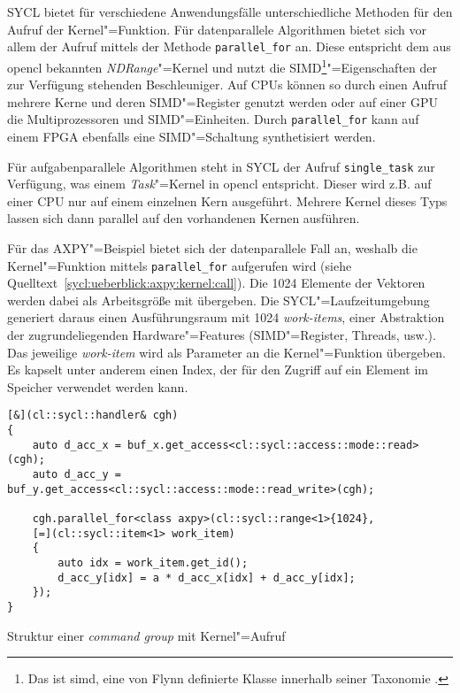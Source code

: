 SYCL bietet für verschiedene Anwendungsfälle unterschiedliche Methoden für den
Aufruf der Kernel"=Funktion. Für datenparallele Algorithmen bietet sich vor
allem der Aufruf mittels der Methode \texttt{parallel\_for} an. Diese
entspricht dem aus \gls{opencl} bekannten \textit{NDRange}"=Kernel und nutzt die
SIMD\footnote{Das ist \gls{simd}, eine von Flynn definierte Klasse innerhalb
seiner Taxonomie \cite[vgl.][]{flynn1966}.}"=Eigenschaften der zur Verfügung
stehenden Beschleuniger. Auf CPUs können so durch einen Aufruf mehrere Kerne und
deren SIMD"=Register genutzt werden oder auf einer GPU die Multiprozessoren und
SIMD"=Einheiten. Durch \texttt{parallel\_for} kann auf einem FPGA ebenfalls eine
SIMD"=Schaltung synthetisiert werden. 

Für aufgabenparallele Algorithmen steht in SYCL der Aufruf \texttt{single\_task}
zur Verfügung, was einem \textit{Task}"=Kernel in \gls{opencl} entspricht.
Dieser wird z.B. auf einer CPU nur auf einem einzelnen Kern ausgeführt. Mehrere
Kernel dieses Typs lassen sich dann parallel auf den vorhandenen Kernen
ausführen.

Für das AXPY"=Beispiel bietet sich der datenparallele Fall an, weshalb die
Kernel"=Funktion mittels \texttt{parallel\_for} aufgerufen wird (siehe
Quelltext~\ref{sycl:ueberblick:axpy:kernel:call}). Die \num{1024} Elemente der
Vektoren werden dabei als Arbeitsgröße mit übergeben. Die SYCL"=Laufzeitumgebung
generiert daraus einen Ausführungsraum mit \num{1024} \textit{work-items}, einer
Abstraktion der zugrundeliegenden Hardware"=Features (SIMD"=Register, Threads,
usw.). Das jeweilige \textit{work-item} wird als Parameter an die
Kernel"=Funktion übergeben. Es kapselt unter anderem einen Index, der für den
Zugriff auf ein Element im Speicher verwendet werden kann. 

\begin{code}
    \begin{verbatim}
[&](cl::sycl::handler& cgh)
{
    auto d_acc_x = buf_x.get_access<cl::sycl::access::mode::read>(cgh);
    auto d_acc_y = buf_y.get_access<cl::sycl::access::mode::read_write>(cgh);

    cgh.parallel_for<class axpy>(cl::sycl::range<1>{1024},
    [=](cl::sycl::item<1> work_item)
    {
        auto idx = work_item.get_id();
        d_acc_y[idx] = a * d_acc_x[idx] + d_acc_y[idx];
    });
}
    \end{verbatim}
    \caption{Struktur einer \textit{command group} mit Kernel"=Aufruf}
    \label{sycl:ueberblick:axpy:kernel:call}
\end{code}

